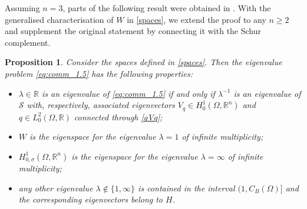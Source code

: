 \documentclass[11pt]{article}
\theoremstyle{plain}
\newtheorem{proposition}[theorem]{Proposition}
\theoremstyle{definition}
\numberwithin{equation}{section}
\newcommand{\R}{\mathbb{R}}
\begin{document}
Assuming $n=3$, parts of the  following result were obtained in \cite[Proposition 3]{Velte_LNM1431_1990}. With the generalised characterisation of $W$ in \eqref{spaces}, we extend the proof to any $n\ge2$ and supplement the original statement by connecting it with the Schur complement.

\begin{proposition}\label{prop:comm_1.3}
Consider the spaces defined in \eqref{spaces}. Then the eigenvalue problem \eqref{eq:comm_1.5} has the following properties:
\begin{itemize}
\item[(a)] $\lambda\in\R$ is an eigenvalue of \eqref{eq:comm_1.5} if and only if $\lambda^{-1}$ is an eigenvalue of $\mathcal{S}$ with, respectively,
associated eigenvectors $V_q\in H^1_0(\Omega,\R^n)$ and $q\in L^2_0(\Omega,\R)$ connected through \eqref{qVq};%
\item[(b)] $W$ is the eigenspace for the eigenvalue $\lambda=1$ of infinite multiplicity;
\item[(c)] $H^1_{0,\sigma}(\Omega,\R^n)$ is the eigenspace for the eigenvalue $\lambda=\infty$ of infinite multiplicity;
\item[(d)] any other eigenvalue $\lambda\not\in\{1,\infty\}$ is contained in the interval $(1,C_B(\Omega)]$ and the corresponding eigenvectors belong
to $H$.
\end{itemize}
\end{proposition}\noindent
\end{document}
